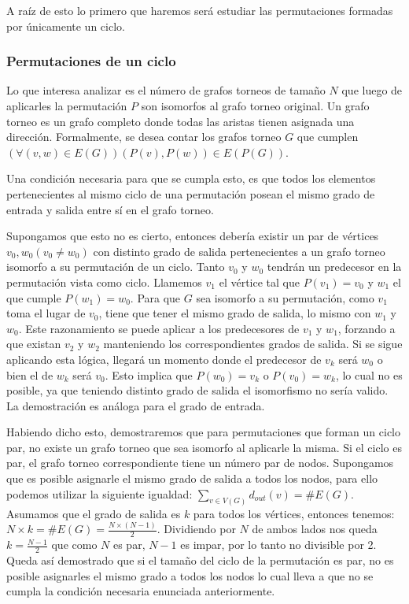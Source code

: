 A raíz de esto lo primero que haremos será estudiar las permutaciones formadas
por únicamente un ciclo.

\subsubsection{Permutaciones de un ciclo} \label{ej4:sec:unciclo}

Lo que interesa analizar es el número de grafos torneos de tamaño $N$ que luego
de aplicarles la permutación $P$ son isomorfos al grafo torneo original. Un
grafo torneo es un grafo completo donde todas las aristas tienen asignada una
dirección. Formalmente, se desea contar los grafos torneo $G$ que cumplen
$(\forall (v, w) \in E(G)) (P(v), P(w)) \in E(P(G))$.

Una condición necesaria para que se cumpla esto, es que todos los elementos
pertenecientes al mismo ciclo de una permutación posean el mismo grado de
entrada y salida entre sí en el grafo torneo.

Supongamos que esto no es cierto, entonces debería existir un par de vértices
$v_0, w_0 (v_0 \neq w_0)$ con distinto grado de salida pertenecientes a un grafo
torneo isomorfo a su permutación de un ciclo. Tanto $v_0$ y $w_0$ tendrán un
predecesor en la permutación vista como ciclo. Llamemos $v_1$ el vértice tal que
$P(v_1) = v_0$ y $w_1$ el que cumple $P(w_1) = w_0$. Para que $G$ sea isomorfo a
su permutación, como $v_1$ toma el lugar de $v_0$, tiene que tener el mismo
grado de salida, lo mismo con $w_1$ y $w_0$. Este razonamiento se puede aplicar
a los predecesores de $v_1$ y $w_1$, forzando a que existan $v_2$ y $w_2$
manteniendo los correspondientes grados de salida. Si se sigue aplicando esta
lógica, llegará un momento donde el predecesor de $v_k$ será $w_0$ o bien el de
$w_k$ será $v_0$. Esto implica que $P(w_0) = v_k$ o $P(v_0) = w_k$, lo cual no
es posible, ya que teniendo distinto grado de salida el isomorfismo no sería
valido. La demostración es análoga para el grado de entrada.

Habiendo dicho esto, demostraremos que para permutaciones que forman un ciclo
par, no existe un grafo torneo que sea isomorfo al aplicarle la misma. Si el
ciclo es par, el grafo torneo correspondiente tiene un número par de nodos.
Supongamos que es posible asignarle el mismo grado de salida a todos los nodos,
para ello podemos utilizar la siguiente igualdad: $\sum_{v \in V(G)} d_{out}(v)
= \#E(G)$. Asumamos que el grado de salida es $k$ para todos los vértices,
entonces tenemos: $N \times k = \#E(G) = \frac{N \times (N - 1)}{2}$. Dividiendo
por $N$ de ambos lados nos queda $k = \frac{N - 1}{2}$ que como $N$ es par, $N -
1$ es impar, por lo tanto no divisible por 2. Queda así demostrado que si el
tamaño del ciclo de la permutación es par, no es posible asignarles el mismo
grado a todos los nodos lo cual lleva a que no se cumpla la condición necesaria
enunciada anteriormente.

